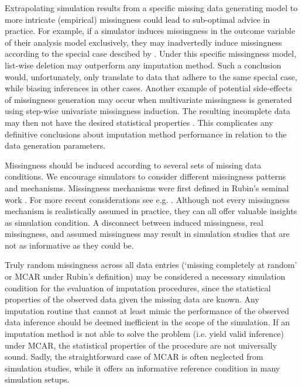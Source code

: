 \documentclass[bimj,fleqn]{w-art}
\begin{document}
Extrapolating simulation results from a specific missing data generating model to more intricate (empirical) missingness could lead to sub-optimal advice in practice. For example, if a simulator induces missingness in the outcome variable of their analysis model exclusively, they may inadvertedly induce missingness according to the special case descibed by \citet[][\S 2.7]{buur18}. Under this specific missingness model, list-wise deletion may outperform any imputation method. Such a conclusion would, unfortunately, only translate to data that adhere to the same special case, while biasing inferences in other cases. %
Another example of potential side-effects of missingness generation may occur when multivariate missingness is generated using step-wise univariate missingness induction. The resulting incomplete data may then not have the desired statistical properties \citep{ampute}. This complicates any definitive conclusions about imputation method performance in relation to the data generation parameters.

Missingness should be induced according to several sets of missing data conditions. We encourage simulators to consider different missingness patterns and mechanisms. Missingness mechanisms were first defined in Rubin's seminal work \citep{rubi76}. For more recent considerations see e.g. \citet{seam13, meal15, dore18, more18, scho18, litt20, moha21, scho21}. Although not every missingness mechanism is realistically assumed in practice, they can all offer valuable insights as simulation condition. A disconnect between induced missingness, real missingness, and assumed missingness may result in simulation studies that are not as informative as they could be.

Truly random missingness across all data entries (`missing completely at random' or MCAR under Rubin's definition) may be considered a necessary simulation condition for the evaluation of imputation procedures, since the statistical properties of the observed data given the missing data are known. Any imputation routine that cannot at least mimic the performance of the observed data inference should be deemed inefficient in the scope of the simulation. If an imputation method is not able to solve the problem (i.e. yield valid inference) under MCAR, the statistical properties of the procedure are not universally sound. Sadly, the straightforward case of MCAR is often neglected from simulation studies, while it offers an informative reference condition in many simulation setups.
\end{document}
